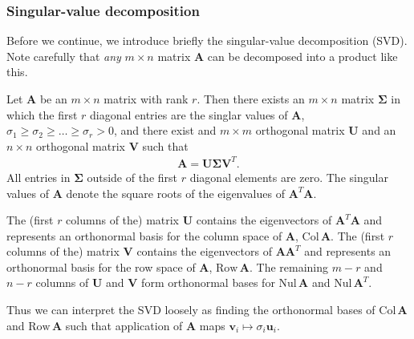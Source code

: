 \documentclass[a4paper]{article}
\begin{document}
\begin{multicols}{2}
\subsubsection{Singular-value decomposition}
Before we continue, we introduce briefly the singular-value decomposition (SVD). Note carefully that \textit{any} $m\times n$ matrix $\mathbf{A}$ can be decomposed into a product like this. 
\begin{grayframe}
Let $\mathbf{A}$ be an $m\times n$ matrix with rank $r$. Then there exists an $m\times n$ matrix $\bm{\Sigma}$ in which the first $r$ diagonal entries are the singlar values of $\mathbf{A}$, $\sigma_1\ge\sigma_2\ge\dots\ge\sigma_r>0$, and there exist and $m\times m$ orthogonal matrix $\mathbf{U}$ and an $n\times n$ orthogonal matrix $\mathbf{V}$ such that 
\begin{align}
\mathbf{A}=\mathbf{U}\bm\Sigma \mathbf{V}^T.
\end{align}
All entries in $\bm \Sigma$ outside of the first $r$ diagonal elements are zero. The singular values of $\mathbf{A}$ denote the square roots of the eigenvalues of $\mathbf{A}^T\mathbf{A}$.\autocite{lay2012linear}
\end{grayframe}
The (first $r$ columns of the) matrix $\mathbf{U}$ contains the eigenvectors of $\mathbf{A}^T\mathbf{A}$ and represents an orthonormal basis for the column space of $\mathbf{A}$, $\text{Col}\,\mathbf{A}$. The (first $r$ columns of the) matrix $\mathbf{V}$ contains the eigenvectors of $\mathbf{A}\mathbf{A}^T$ and represents an orthonormal basis for the row space of $\mathbf{A}$, $\text{Row}\,\mathbf{A}$. The remaining $m-r$ and $n-r$ columns of $\mathbf{U}$ and $\mathbf{V}$ form orthonormal bases for $\text{Nul}\,\mathbf{A}$ and $\text{Nul}\,\mathbf{A}^T$.

Thus we can interpret the SVD loosely as finding the orthonormal bases of $\text{Col}\,\mathbf{A}$ and $\text{Row}\,\mathbf{A}$ such that application of $\mathbf{A}$ maps $\mathbf{v}_i\mapsto \sigma_i\mathbf{u}_i$.


\end{multicols}
\end{document}
